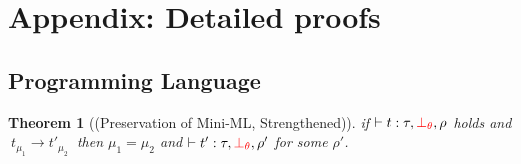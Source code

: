 \documentclass[a4paper,11pt,oneside]{article}
\theoremstyle{plain}
\newtheorem{theorem}[definition]{Theorem}
\newcommand{\bth}{\bot_\theta}
\newcommand{\evalstep}[4]{~#1_{\mu_#2} \rightarrow #3_{\mu_#4} ~}
\begin{document}
\appendix
\newpage
\section{Appendix: Detailed proofs} 






\subsection{Programming Language}
\hypertarget{proof:preserv-prop-p}{} 
\begin{theorem}[(Preservation of Mini-ML, Strengthened)] 
if $\vdash t : \tau, \textcolor{red}{\bth}, \rho$ holds and $\evalstep{t}{1}{t'}{2}$ then $\mu_1 = \mu_2$ and $\vdash t' : \tau, \textcolor{red}{\bth}, \rho'$ for some $\rho'$.

\end{theorem}
\end{document}
